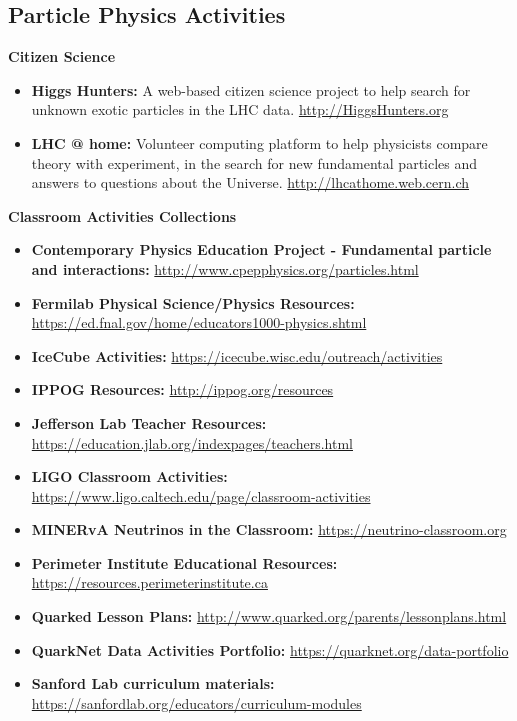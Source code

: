\subsection{Particle Physics
Activities}\label{databases:subsec:parphysactivities}

\textbf{Citizen Science}

\begin{itemize}
\tightlist
\item
  \textbf{Higgs Hunters:} A web-based citizen science project to help
  search for unknown exotic particles in the LHC data.
  \url{http://HiggsHunters.org}
\item
  \textbf{LHC @ home:} Volunteer computing platform to help physicists
  compare theory with experiment, in the search for new fundamental
  particles and answers to questions about the Universe.
  \url{http://lhcathome.web.cern.ch}
\end{itemize}

\textbf{Classroom Activities Collections}

\begin{itemize}
\tightlist
\item
  \textbf{Contemporary Physics Education Project - Fundamental particle
  and interactions:} \url{http://www.cpepphysics.org/particles.html}
\item
  \textbf{Fermilab Physical Science/Physics Resources:}
  \url{https://ed.fnal.gov/home/educators1000-physics.shtml}
\item
  \textbf{IceCube Activities:}
  \url{https://icecube.wisc.edu/outreach/activities}
\item
  \textbf{IPPOG Resources:} \url{http://ippog.org/resources}
\item
  \textbf{Jefferson Lab Teacher Resources:}
  \url{https://education.jlab.org/indexpages/teachers.html}
\item
  \textbf{LIGO Classroom Activities:}
  \url{https://www.ligo.caltech.edu/page/classroom-activities}
\item
  \textbf{MINERvA Neutrinos in the Classroom:}
  \url{https://neutrino-classroom.org}
\item
  \textbf{Perimeter Institute Educational Resources:}
  \url{https://resources.perimeterinstitute.ca}
\item
  \textbf{Quarked Lesson Plans:}
  \url{http://www.quarked.org/parents/lessonplans.html}
\item
  \textbf{QuarkNet Data Activities Portfolio:}
  \url{https://quarknet.org/data-portfolio}
\item
  \textbf{Sanford Lab curriculum materials:}
  \url{https://sanfordlab.org/educators/curriculum-modules}
\end{itemize}


